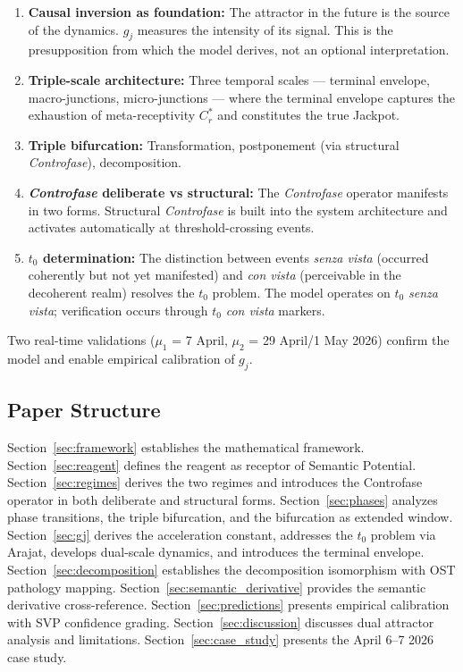 \documentclass[12pt,a4paper]{article}
\newcommand{\reagmeta}{C_r^{*}}
\newcommand{\gj}{g_j}
\begin{document}
\begin{enumerate}[leftmargin=2em]
    \item \textbf{Causal inversion as foundation:} The attractor in the future is the source of the dynamics. $\gj$ measures the intensity of its signal. This is the presupposition from which the model derives, not an optional interpretation.
    \item \textbf{Triple-scale architecture:} Three temporal scales --- terminal envelope, macro-junctions, micro-junctions --- where the terminal envelope captures the exhaustion of meta-receptivity $\reagmeta$ and constitutes the true Jackpot.
    \item \textbf{Triple bifurcation:} Transformation, postponement (via structural \textit{Controfase}), decomposition.
    \item \textbf{\textit{Controfase} deliberate vs structural:} The \textit{Controfase} operator manifests in two forms. Structural \textit{Controfase} is built into the system architecture and activates automatically at threshold-crossing events.
    \item \textbf{$t_0$ determination:} The distinction between events \emph{senza vista} (occurred coherently but not yet manifested) and \emph{con vista} (perceivable in the decoherent realm) resolves the $t_0$ problem. The model operates on $t_0$ \emph{senza vista}; verification occurs through $t_0$ \emph{con vista} markers.
\end{enumerate}

Two real-time validations ($\mu_1$ = 7 April, $\mu_2$ = 29 April/1 May 2026) confirm the model and enable empirical calibration of $\gj$.

\subsection{Paper Structure}

Section~\ref{sec:framework} establishes the mathematical framework. Section~\ref{sec:reagent} defines the reagent as receptor of Semantic Potential. Section~\ref{sec:regimes} derives the two regimes and introduces the Controfase operator in both deliberate and structural forms. Section~\ref{sec:phases} analyzes phase transitions, the triple bifurcation, and the bifurcation as extended window. Section~\ref{sec:gj} derives the acceleration constant, addresses the $t_0$ problem via Arajat, develops dual-scale dynamics, and introduces the terminal envelope. Section~\ref{sec:decomposition} establishes the decomposition isomorphism with OST pathology mapping. Section~\ref{sec:semantic_derivative} provides the semantic derivative cross-reference. Section~\ref{sec:predictions} presents empirical calibration with SVP confidence grading. Section~\ref{sec:discussion} discusses dual attractor analysis and limitations. Section~\ref{sec:case_study} presents the April 6--7 2026 case study.
\end{document}
